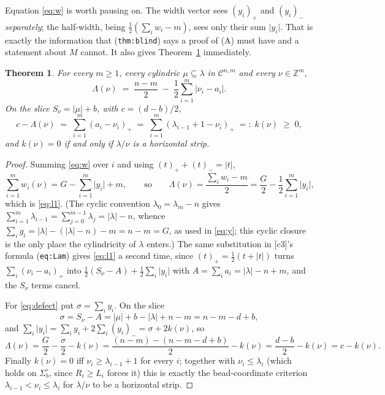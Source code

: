 \documentclass[11pt]{article}
\newtheorem{theorem}{Theorem}
\theoremstyle{definition}
\newcommand{\Z}{\mathbb Z}
\newcommand{\abs}[1]{\lvert #1\rvert}
\newcommand{\pos}[1]{(#1)_{+}}
\newcommand{\nneg}[1]{(#1)_{-}}
\begin{document}
Equation \eqref{eq:w} is worth pausing on. The width vector sees $\pos{y_i}$ and $\nneg{y_i}$
\emph{separately}; the half-width, being $\tfrac12(\sum_iw_i-m)$, sees only their sum
$\abs{y_i}$. That is exactly the information that (\texttt{thm:blind}) says a proof of (A) must
have and a statement about $M$ cannot. It also gives Theorem~\ref{thm:l1} immediately.

\begin{theorem}\label{thm:l1}
For every $m\ge1$, every cylindric $\mu\subseteq\lambda$ in $\mathcal C^{n,m}$ and every
$\nu\in\Z^m$,
\begin{equation}\label{eq:l1}
  \Lambda(\nu)\;=\;\frac{n-m}{2}\;-\;\frac12\sum_{i=1}^m\abs{\nu_i-a_i}.
\end{equation}
On the slice $S_\nu=\abs\mu+b$, with $c=(d-b)/2$,
\begin{equation}\label{eq:defect}
  c-\Lambda(\nu)\;=\;\sum_{i=1}^m\pos{a_i-\nu_i}\;=\;\sum_{i=1}^m\pos{\lambda_{i-1}+1-\nu_i}\;=:\;k(\nu)\;\ge\;0 ,
\end{equation}
and $k(\nu)=0$ if and only if $\lambda/\nu$ is a horizontal strip.
\end{theorem}

\begin{proof}
Summing \eqref{eq:w} over $i$ and using $\pos t+\nneg t=\abs t$,
\[
  \sum_{i=1}^mw_i(\nu)=G-\sum_{i=1}^m\abs{y_i}+m,
  \qquad\text{so}\qquad
  \Lambda(\nu)=\frac{\sum_iw_i-m}{2}=\frac{G}{2}-\frac12\sum_{i=1}^m\abs{y_i},
\]
which is \eqref{eq:l1}. (The cyclic convention $\lambda_0=\lambda_m-n$ gives
$\sum_{i=1}^m\lambda_{i-1}=\sum_{j=0}^{m-1}\lambda_j=\abs\lambda-n$, whence
$\sum_ig_i=\abs\lambda-(\abs\lambda-n)-m=n-m=G$, as used in \eqref{eq:y}; this cyclic
closure is the only place the cylindricity of $\lambda$ enters.) The same substitution in
[c3]'s formula (\texttt{eq:Lam}) gives \eqref{eq:l1} a second time, since
$\pos t=\tfrac12(t+\abs t)$ turns $\sum_i\pos{\nu_i-a_i}$ into
$\tfrac12(S_\nu-A)+\tfrac12\sum_i\abs{y_i}$ with $A=\sum_ia_i=\abs\lambda-n+m$, and the
$S_\nu$ terms cancel.

For \eqref{eq:defect} put $\sigma=\sum_iy_i$. On the slice
\begin{equation}\label{eq:sigma}
  \sigma=S_\nu-A=\abs\mu+b-\abs\lambda+n-m=n-m-d+b,
\end{equation}
and $\sum_i\abs{y_i}=\sum_iy_i+2\sum_i\nneg{y_i}=\sigma+2k(\nu)$, so
\[
  \Lambda(\nu)=\frac{G}{2}-\frac{\sigma}{2}-k(\nu)=\frac{(n-m)-(n-m-d+b)}{2}-k(\nu)
  =\frac{d-b}{2}-k(\nu)=c-k(\nu).
\]
Finally $k(\nu)=0$ iff $\nu_i\ge\lambda_{i-1}+1$ for every $i$; together with
$\nu_i\le\lambda_i$ (which holds on $\Sigma_b^\circ$, since $R_i\ge L_i$ forces it) this is
exactly the bead-coordinate criterion $\lambda_{i-1}<\nu_i\le\lambda_i$ for $\lambda/\nu$ to be
a horizontal strip.
\end{proof}
\end{document}
